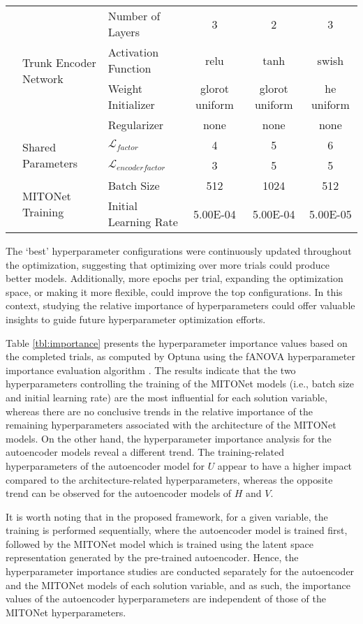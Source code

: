 \documentclass[draft]{agujournal2019}
\begin{document}
\begin{table}[h]
{\begin{tabular}{p{.3cm} l l c c c}
 & \multirow{4}{*}{Trunk Encoder Network} 
 & Number of Layers & 3 & 2 & 3 \\
 && Activation Function & relu & tanh & swish \\
 && Weight Initializer & glorot uniform & glorot uniform & he uniform \\
 && Regularizer & none & none & none \\ \hhline{~-----}

 & \multirow{2}{*}{Shared Parameters} 
 & $\mathcal{L}_{factor}$ & 4 & 5 & 6 \\
 && $\mathcal{L}_{encoder factor}$ & 3 & 5 & 5 \\ \hhline{~-----}

 & \multirow{2}{*}{MITONet Training} 
 & Batch Size & 512 & 1024 & 512 \\
 && Initial Learning Rate & 5.00E-04 & 5.00E-04 & 5.00E-05 \\ \hline
\end{tabular}
}
\end{table}

The ‘best’ hyperparameter configurations were continuously updated throughout the optimization, suggesting that optimizing over more trials could produce better models. Additionally, more epochs per trial, expanding the optimization space, or making it more flexible, could improve the top configurations. In this context, studying the relative importance of hyperparameters could offer valuable insights to guide future hyperparameter optimization efforts. 

Table \ref{tbl:importance} presents the hyperparameter importance values based on the completed trials, as computed by Optuna using the fANOVA hyperparameter importance evaluation algorithm \cite{hutter2014fanova}. The results indicate that the two hyperparameters controlling the training of the MITONet models (i.e., batch size and initial learning rate) are the most influential for each solution variable, whereas there are no conclusive trends in the relative importance of the remaining hyperparameters associated with the architecture of the MITONet models. On the other hand, the hyperparameter importance analysis for the autoencoder models reveal a different trend. The training-related hyperparameters of the autoencoder model for $U$ appear to have a higher impact compared to the architecture-related hyperparameters, whereas the opposite trend can be observed for the autoencoder models of $H$ and $V$. 

It is worth noting that in the proposed framework, for a given variable, the training is performed sequentially, where the autoencoder model is trained first, followed by the MITONet model which is trained using the latent space representation generated by the pre-trained autoencoder. Hence, the hyperparameter importance studies are conducted separately for the autoencoder and the MITONet models of each solution variable, and as such, the importance values of the autoencoder hyperparameters are independent of those of the MITONet hyperparameters. 
\end{document}
